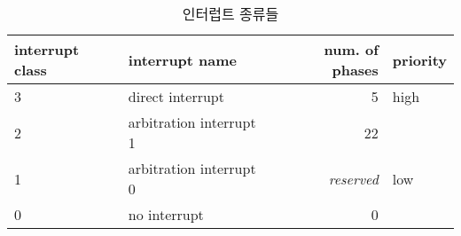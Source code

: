 %
%
\begin{table}[htbp]
\caption{인터럽트 종류들}\label{table:int-class}
   \begin{center}
   \begin{tabular}{|l|l|r|l|} \hline
	interrupt class & interrupt name & num. of phases & priority\\
\hline \hline
	3 & direct interrupt & 5 & high \\
	2 & arbitration interrupt 1 & 22 & \\
	1 & arbitration interrupt 0 & {\it reserved\/} & low \\
	0 & no interrupt & 0 & \\
\hline
   \end{tabular}
   \end{center}
\end{table}
%
%
